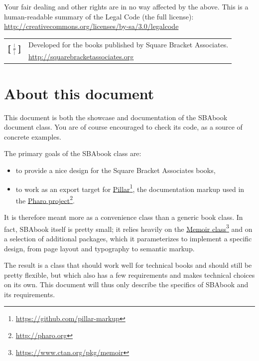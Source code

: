 \documentclass[english,twoside,openany,showtrims]{sbabook}
\newcommand\hrefnote[2]{%
  \href{#1}{#2}\footnote{\url{#1}}}
\begin{document}
{  Your fair dealing and other rights are in no way affected by the
  above. This is a human-readable summary of the Legal Code (the full
  license): \\
  \url{http://creativecommons.org/licenses/by-sa/3.0/legalcode}

  \vfill

  \begin{tabular}{@{}c@{\quad}l}
    \multirow{2}{*}{\includegraphics[width=2em]{sba-logo.pdf}}
    & Developed for the books published by Square Bracket Associates. \\
    & \url{http://squarebracketassociates.org} \\[\smallskipamount]
  \end{tabular}
}


\frontmatter
\pagestyle{plain}

\chapter*{About this document}

This document is both the showcase and documentation of the SBAbook document
class.
You are of course encouraged to check its code, as a source of concrete examples.

The primary goals of the SBAbook class are:
\begin{itemize}
\item to provide a nice design for the Square Bracket Associates books,
\item to work as an export target for
  \hrefnote{https://github.com/pillar-markup}{Pillar}, the documentation markup
  used in the \hrefnote{http://pharo.org}{Pharo project}.
\end{itemize}
It is therefore meant more as a convenience class than a generic book class.
In fact, SBAbook itself is pretty small; it relies heavily on the
\hrefnote{https://www.ctan.org/pkg/memoir}{Memoir class} and on a selection of
additional packages, which it parameterizes to implement a specific design, from
page layout and typography to semantic markup.

The result is a class that should work well for technical books and should still
be pretty flexible, but which also has a few requirements and makes technical
choices on its own.
This document will thus only describe the specifics of SBAbook and its requirements.
\end{document}
